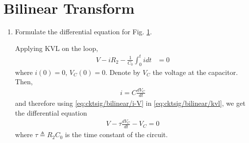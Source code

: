 \documentclass[journal,12pt,twocolumn]{IEEEtran}
\renewcommand\thesection{\arabic{section}}
\begin{document}
\section{Bilinear Transform}
\begin{enumerate}[label=\arabic*.,ref=\thesection.\theenumi]
\item Formulate the differential equation for Fig. \ref{fig:cktsig/bilinear/ckt}.
	
\begin{figure}[!htb]
    \begin{center}
	    
    \end{center}
\caption{}
\label{fig:cktsig/bilinear/ckt}
\end{figure}

\solution
Applying KVL on the loop,
\begin{align}
    V - iR_2 - \frac{1}{C_0}\int_0^tidt &= 0
    \label{eq:cktsig/bilinear/kvl}
\end{align}
where $i(0) = 0$, $V_C(0) = 0$. Denote by $V_C$ the voltage at the capacitor.
Then,
\begin{align}
    i = C\frac{dV_C}{dt}
    \label{eq:cktsig/bilinear/i-V}
\end{align}
and therefore using \eqref{eq:cktsig/bilinear/i-V} in \eqref{eq:cktsig/bilinear/kvl}, we get the differential equation
\begin{align}
    V - \tau\frac{dV_C}{dt} - V_C = 0
    \label{eq:cktsig/bilinear/diff-eqn}
\end{align}
where $\tau \triangleq R_2C_0$ is the time constant of the circuit.


\end{enumerate}
\end{document}
